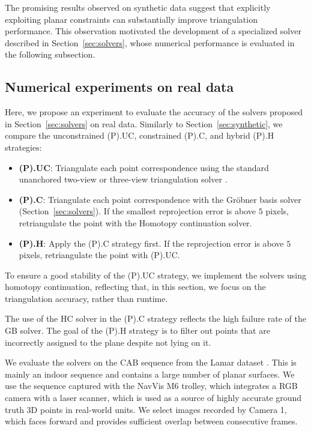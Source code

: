 \documentclass{article}
\begin{document}
The promising results observed on synthetic data suggest that explicitly exploiting planar constraints can substantially improve triangulation performance. This observation motivated the development of a specialized solver described in Section~\ref{sec:solvers}, whose numerical performance is evaluated in the following subsection.
\subsection{Numerical experiments on real data}\label{sec:real}
Here, we propose an experiment to evaluate the accuracy of the solvers proposed in Section~\ref{sec:solvers} on real data.
Similarly to Section~\ref{sec:synthetic}, we compare the unconstrained (P).UC, constrained (P).C, and hybrid (P).H strategies:
\begin{itemize}
    \item \textbf{(P).UC}: Triangulate each point correspondence using the standard unanchored two-view \cite{DBLP:conf/caip/HartleyS95} or three-view triangulation solver \cite{DBLP:conf/accv/ByrodJA07}.
    \item \textbf{(P).C}: Triangulate each point correspondence with the Gr\"obner basis solver (Section~\ref{sec:solvers}). If the smallest reprojection error is above $5$ pixels, retriangulate the point with the Homotopy continuation solver. 
    \item \textbf{(P).H}: Apply the (P).C strategy first. If the reprojection error is above $5$ pixels, retriangulate the point with (P).UC.
\end{itemize}
To ensure a good stability of the (P).UC strategy, we implement the solvers \cite{DBLP:conf/caip/HartleyS95,DBLP:conf/accv/ByrodJA07} using homotopy continuation, reflecting that, in this section, we focus on the triangulation accuracy, rather than runtime.

The use of the HC solver in the (P).C strategy reflects the high failure rate of the GB solver. The goal of the (P).H strategy is to filter out points that are incorrectly assigned to the plane despite not lying on it.

We evaluate the solvers on the CAB sequence from the Lamar dataset \cite{sarlin2022lamar}. This is mainly an indoor sequence and contains a large number of planar surfaces. We use the sequence captured with the NavVis M6 trolley, which integrates a RGB camera with a laser scanner, which is used as a source of highly accurate ground truth 3D points in real-world units. We select images recorded by Camera 1, which faces forward and provides sufficient overlap between consecutive frames.
\end{document}
